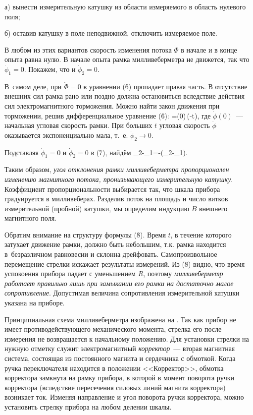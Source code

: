 а) вынести измерительную катушку из области измеряемого в область
нулевого поля;

б) оставив катушку в поле неподвижной, отключить измеряемое поле.

В любом  из этих вариантов скорость изменения потока $\dot{\Phi}$ в начале и в конце опыта равна нулю. В начале опыта
рамка милливеберметра не движется, так что $\dot{\phi}_1=0$. Покажем, что и $\dot{\phi}_2=0$.

В~самом деле, при $\dot{\Phi}=0$ в уравнении (\r{6}) пропадает правая часть. В отсутствие внешних сил рамка рано или
поздно должна остановиться вследствие действия сил электромагнитного торможения. Можно найти закон движения при
торможении, решив дифференциальное уравнение (\r{6}):
\dot{\phi}=\dot{\phi}(0)\,\exp\left(-t\right),
\ee
где $\dot{\phi}(0)$~--- начальная угловая скорость рамки. При больших $t$ угловая скорость $\dot{\phi}$ оказывается
экспоненциально мала, т.~е. $\dot{\phi}_2\rightarrow 0$.

Подставляя $\dot{\phi}_1=0$ и $\dot{\phi}_2=0$ в (\r{7}), найдём
\phi_2-\phi_1=-(\Phi_2-\Phi_1).
\ee

Таким образом, \emph{угол отклонения рамки милливеберметра пропорционален изменению магнитного потока, пронизывающего
измерительную катушку}. Коэффициент пропорциональности выбирается так, что шкала прибора градуируется в милливеберах.
Разделив поток на площадь и число витков измерительной (пробной) катушки, мы определим индукцию $B$ внешнего магнитного
поля.


Обратим внимание на структуру формулы (\r{8}). Время $t$, в течение которого затухает движение рамки, должно быть
небольшим, т.к. рамка находится в~безразличном равновесии и склонна дрейфовать. Самопроизвольное перемещение стрелки
искажает результаты измерений. Из (\r{8}) видно, что время успокоения прибора падает с уменьшением $R$, поэтому
\emph{милливеберметр работает правильно лишь при замыкании его рамки на достаточно малое сопротивление}. Допустимая
величина сопротивления измерительной катушки указана на приборе.

Принципиальная схема милливеберметра изображена на . Так как прибор не имеет противодействующего механического
момента, стрелка его после измерения не возвращается к начальному положению. Для установки стрелки на нужную отметку
служит электромагнитный \emph {корректор}~--- вторая магнитная система, состоящая из постоянного магнита и сердечника с
обмоткой. Когда ручка переключателя находится в положении <<Корректор>>, обмотка корректора замкнута на рамку прибора, в
которой в момент поворота ручки корректора (вследствие пересечения силовых линий магнита корректора) возникает ток.
Изменяя направление и угол поворота ручки корректора, можно установить стрелку прибора на любом делении шкалы.

